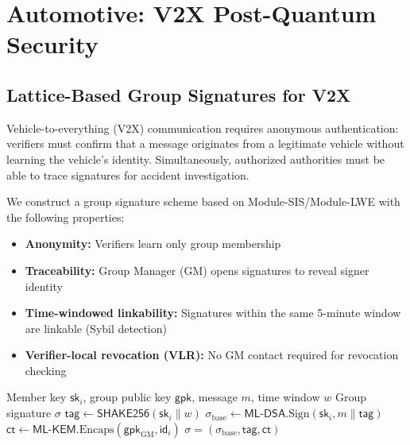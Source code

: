 \documentclass[conference,10pt]{IEEEtran}
\newcommand{\mlkem}{\textsf{ML-KEM}}
\newcommand{\mldsa}{\textsf{ML-DSA}}
\newcommand{\shake}{\textsf{SHAKE256}}
\begin{document}
\section{Automotive: V2X Post-Quantum Security}
\label{sec:automotive}

\subsection{Lattice-Based Group Signatures for V2X}

Vehicle-to-everything (V2X) communication requires anonymous authentication: verifiers must confirm that a message originates from a legitimate vehicle without learning the vehicle's identity. Simultaneously, authorized authorities must be able to trace signatures for accident investigation.

We construct a group signature scheme based on Module-SIS/Module-LWE with the following properties:

\begin{itemize}
    \item \textbf{Anonymity:} Verifiers learn only group membership
    \item \textbf{Traceability:} Group Manager (GM) opens signatures to reveal signer identity
    \item \textbf{Time-windowed linkability:} Signatures within the same 5-minute window are linkable (Sybil detection)
    \item \textbf{Verifier-local revocation (VLR):} No GM contact required for revocation checking
\end{itemize}

\begin{algorithm}[t]
\caption{V2X Group Signature Generation}
\label{alg:v2x}
\begin{algorithmic}[1]
\REQUIRE Member key $\mathsf{sk}_i$, group public key $\mathsf{gpk}$, message $m$, time window $w$
\ENSURE Group signature $\sigma$
\STATE $\mathsf{tag} \leftarrow \shake{}(\mathsf{sk}_i \| w)$ 
\STATE $\sigma_{\text{base}} \leftarrow \mldsa{}.\text{Sign}(\mathsf{sk}_i, m \| \mathsf{tag})$
\STATE $\mathsf{ct} \leftarrow \mlkem{}.\text{Encaps}(\mathsf{gpk}_{\text{GM}}, \mathsf{id}_i)$ 
\RETURN $\sigma = (\sigma_{\text{base}}, \mathsf{tag}, \mathsf{ct})$
\end{algorithmic}
\end{algorithm}
\end{document}
